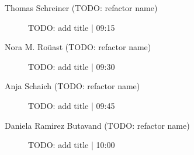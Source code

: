 \begin{symposium}
\begin{description}
                \item [Thomas Schreiner  (TODO: refactor name)] TODO: add title \textcolor{mygray}{ | 09:15}    
                
                \item [Nora M. Roüast (TODO: refactor name)] TODO: add title \textcolor{mygray}{ | 09:30}    
                
                \item [Anja Schaich (TODO: refactor name)] TODO: add title \textcolor{mygray}{ | 09:45}    
                
                \item [Daniela Ramirez Butavand (TODO: refactor name)] TODO: add title \textcolor{mygray}{ | 10:00}    
                
            \end{description} 
            \end{symposium}
            
